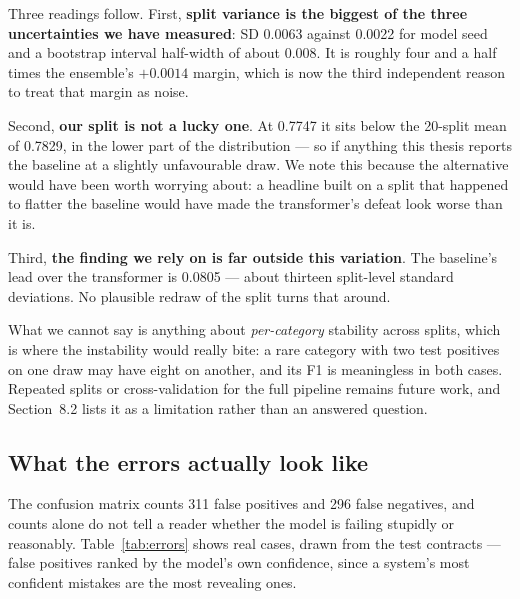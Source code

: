 Three readings follow. First, \textbf{split variance is the biggest of the three uncertainties we have measured}: SD 0.0063 against 0.0022 for model seed and a bootstrap interval half-width of about 0.008. It is roughly four and a half times the ensemble's $+0.0014$ margin, which is now the third independent reason to treat that margin as noise.

Second, \textbf{our split is not a lucky one}. At 0.7747 it sits below the 20-split mean of 0.7829, in the lower part of the distribution --- so if anything this thesis reports the baseline at a slightly unfavourable draw. We note this because the alternative would have been worth worrying about: a headline built on a split that happened to flatter the baseline would have made the transformer's defeat look worse than it is.

Third, \textbf{the finding we rely on is far outside this variation}. The baseline's lead over the transformer is 0.0805 --- about thirteen split-level standard deviations. No plausible redraw of the split turns that around.

What we cannot say is anything about \emph{per-category} stability across splits, which is where the instability would really bite: a rare category with two test positives on one draw may have eight on another, and its F1 is meaningless in both cases. Repeated splits or cross-validation for the full pipeline remains future work, and Section~8.2 lists it as a limitation rather than an answered question.

\subsection{What the errors actually look like}
\label{sec:errorexamples}
The confusion matrix counts 311 false positives and 296 false negatives, and counts alone do not tell a reader whether the model is failing stupidly or reasonably. Table~\ref{tab:errors} shows real cases, drawn from the test contracts --- false positives ranked by the model's own confidence, since a system's most confident mistakes are the most revealing ones.

